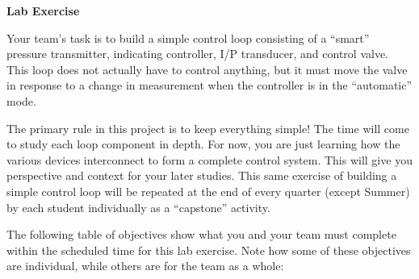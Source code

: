 \begin{itemize}





\noindent
{\bf Lab Exercise} 

\vskip 5pt

Your team's task is to build a simple control loop consisting of a ``smart'' pressure transmitter, indicating controller, I/P transducer, and control valve.  This loop does not actually have to control anything, but it must move the valve in response to a change in measurement when the controller is in the ``automatic'' mode.  

The primary rule in this project is to keep everything simple!  The time will come to study each loop component in depth.  For now, you are just learning how the various devices interconnect to form a complete control system.  This will give you perspective and context for your later studies.  This same exercise of building a simple control loop will be repeated at the end of every quarter (except Summer) by each student individually as a ``capstone'' activity.


The following table of objectives show what you and your team must complete within the scheduled time for this lab exercise.  Note how some of these objectives are individual, while others are for the team as a whole:

\vskip 10pt




\end{itemize}
